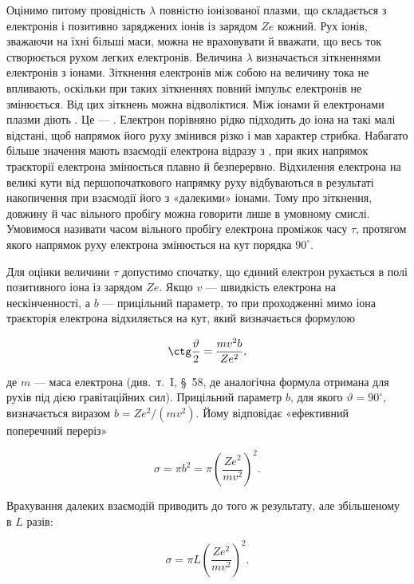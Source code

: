 Оцінимо питому провідність $\lambda$ повністю іонізованої плазми, що складається з електронів і позитивно заряджених іонів із зарядом $Ze$ кожний. Рух іонів, зважаючи на їхні більші маси, можна не враховувати й вважати, що весь ток створюється рухом легких електронів. Величина $\lambda$ визначається зіткненнями електронів з іонами. Зіткнення електронів між собою на величину тока не впливають, оскільки при таких зіткненнях повний імпульс електронів не змінюється. Від цих зіткнень можна відволіктися. Між
іонами й електронами плазми діють . Це --- . Електрон порівняно рідко підходить до іона на такі малі відстані, щоб напрямок його руху змінився різко і мав характер стрибка. Набагато більше значення мають взаємодії електрона відразу з , при яких напрямок траєкторії електрона змінюється плавно й безперервно. Відхилення електрона на великі кути від першопочаткового напрямку руху відбуваються в результаті накопичення  при взаємодії його з «далекими» іонами. Тому про зіткнення, довжину й час вільного пробігу можна говорити лише в умовному смислі. Умовимося називати часом вільного пробігу електрона проміжок часу $\tau$, протягом якого напрямок руху електрона змінюється на кут порядка $90^\circ$.

Для оцінки величини $\tau$ допустимо спочатку, що єдиний електрон рухається в полі позитивного іона із зарядом $Ze$. Якщо $v$ --- швидкість електрона на нескінченності, а $b$ --- прицільний параметр, то при проходженні мимо іона траєкторія електрона відхиляється на кут, який визначається формулою

\begin{equation*}
	\ctg\frac{\vartheta}{2} = \frac{mv^2b}{Ze^2},
\end{equation*}

де $m$ --- маса електрона (див.~т.~I, \S~58, де аналогічна формула отримана для рухів під дією гравітаційних сил). Прицільний параметр $b$, для якого $\vartheta = 90^\circ$, визначається виразом $b = Ze^2/(mv^2)$. Йому відповідає «ефективний поперечний переріз»

\begin{equation*}
	\sigma = \pi b^2 = \pi\left(\frac{Ze^2}{mv^2}\right)^2.
\end{equation*}

Врахування далеких взаємодій приводить до того ж результату, але збільшеному в $L$ разів:

\begin{equation*}
	\sigma = \pi L\left(\frac{Ze^2}{mv^2}\right)^2.
\end{equation*}

